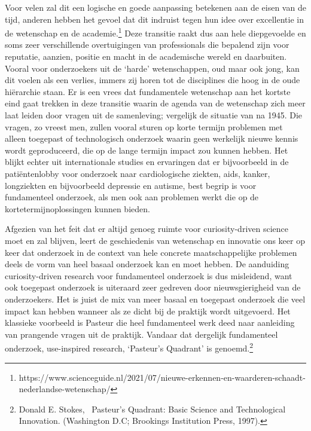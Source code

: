 \documentclass{jote-book}
\begin{document}
	Voor velen zal dit een logische en goede aanpassing betekenen aan de eisen van de tijd, anderen hebben het gevoel dat dit indruist tegen hun idee over excellentie in de wetenschap en de academie.\footnote{https://www.scienceguide.nl/2021/07/nieuwe-erkennen-en-waarderen-schaadt-nederlandse-wetenschap/} Deze transitie raakt dus aan hele diepgevoelde en soms zeer verschillende overtuigingen van professionals die bepalend zijn voor reputatie, aanzien, positie en macht in de academische wereld en daarbuiten. Vooral voor onderzoekers uit de ‘harde' wetenschappen, oud maar ook jong, kan dit voelen als een verlies, immers zij horen tot de disciplines die hoog in de oude hiërarchie staan. Er is een vrees dat fundamentele wetenschap aan het kortste eind gaat trekken in deze transitie waarin de agenda van de wetenschap zich meer laat leiden door vragen uit de samenleving; vergelijk de situatie van na 1945. Die vragen, zo vreest men, zullen vooral sturen op korte termijn problemen met alleen toegepast of technologisch onderzoek waarin geen werkelijk nieuwe kennis wordt geproduceerd, die op de lange termijn impact zou kunnen hebben. Het blijkt echter uit internationale studies en ervaringen dat er bijvoorbeeld in de patiëntenlobby voor onderzoek naar cardiologische ziekten, aids, kanker, longziekten en bijvoorbeeld depressie en autisme, best begrip is voor fundamenteel onderzoek, als men ook aan problemen werkt die op de kortetermijnoplossingen kunnen bieden.



	Afgezien van het feit dat er altijd genoeg ruimte voor curiosity-driven science moet en zal blijven, leert de geschiedenis van wetenschap en innovatie ons keer op keer dat onderzoek in de context van hele concrete maatschappelijke problemen deels de vorm van heel basaal onderzoek kan en moet hebben. De aanduiding curiosity-driven research voor fundamenteel onderzoek is dus misleidend, want ook toegepast onderzoek is uiteraard zeer gedreven door nieuwsgierigheid van de onderzoekers. Het is juist de mix van meer basaal en toegepast onderzoek die veel impact kan hebben wanneer als ze dicht bij de praktijk wordt uitgevoerd. Het klassieke voorbeeld is Pasteur die heel fundamenteel werk deed naar aanleiding van prangende vragen uit de praktijk. Vandaar dat dergelijk fundamenteel onderzoek, use-inspired research, ‘Pasteur's Quadrant' is genoemd.\footnote{Donald E. Stokes,  Pasteur's Quadrant: Basic Science and Technological Innovation. (Washington D.C; Brookings Institution Press, 1997).}
\end{document}

